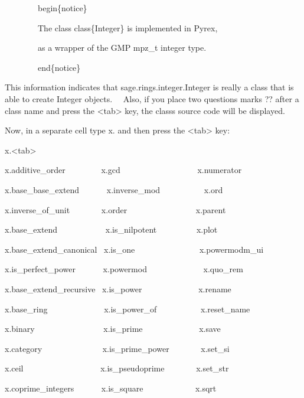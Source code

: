 \documentclass[12pt,twoside]{book}
\begin{document}
\bigskip

\ \ \ \ \ \ \ \ begin\{notice\} 

\ \ \ \ \ \ \ \ The class class\{Integer\} is implemented in Pyrex, 

\ \ \ \ \ \ \ \ as a wrapper of the GMP mpz\_t integer type. 

\ \ \ \ \ \ \ \ end\{notice\} 


\bigskip

This information indicates that sage.rings.integer.Integer is really a class that is able to create Integer objects. \ \ Also, if you place two questions marks {\textquotesingle}??{\textquotesingle} after a class name and press the {\textless}tab{\textgreater} key, the class{\textquotesingle}s source code will be displayed. 

\bigskip

Now, in a separate cell type x. and then press the {\textless}tab{\textgreater} key: 

\bigskip

x.{\textless}tab{\textgreater}

{\textbar}

x.additive\_order \ \ \ \ \ \ \ \ x.gcd
\ \ \ \ \ \ \ \ \ \ \ \ \ \ \ \ \ \ x.numerator

x.base\_base\_extend \ \ \ \ \ \ x.inverse\_mod
\ \ \ \ \ \ \ \ \ \ x.ord

x.inverse\_of\_unit \ \ \ \ \ \ \ x.order
\ \ \ \ \ \ \ \ \ \ \ \ \ \ \ \ x.parent

x.base\_extend \ \ \ \ \ \ \ \ \ \ \ x.is\_nilpotent
\ \ \ \ \ \ \ \ \ x.plot

x.base\_extend\_canonical \ x.is\_one
\ \ \ \ \ \ \ \ \ \ \ \ \ \ \ x.powermodm\_ui

x.is\_perfect\_power \ \ \ \ \ \ x.powermod
\ \ \ \ \ \ \ \ \ \ \ \ \ x.quo\_rem

x.base\_extend\_recursive \ x.is\_power
\ \ \ \ \ \ \ \ \ \ \ \ \ x.rename

x.base\_ring \ \ \ \ \ \ \ \ \ \ \ \ \ x.is\_power\_of
\ \ \ \ \ \ \ \ \ \ x.reset\_name

x.binary \ \ \ \ \ \ \ \ \ \ \ \ \ \ \ \ x.is\_prime
\ \ \ \ \ \ \ \ \ \ \ \ \ x.save

x.category \ \ \ \ \ \ \ \ \ \ \ \ \ \ x.is\_prime\_power
\ \ \ \ \ \ \ x.set\_si

x.ceil \ \ \ \ \ \ \ \ \ \ \ \ \ \ \ \ \ \ x.is\_pseudoprime
\ \ \ \ \ \ \ x.set\_str

x.coprime\_integers \ \ \ \ \ \ x.is\_square
\ \ \ \ \ \ \ \ \ \ \ \ x.sqrt
\end{document}
